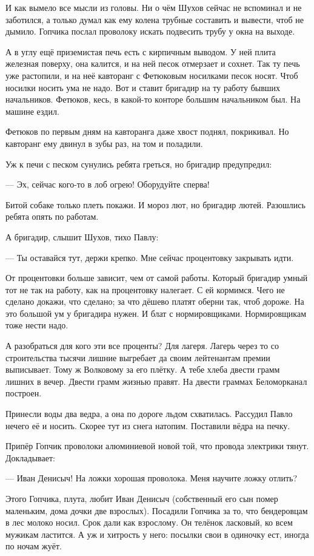 И \dash как вымело все мысли из головы. Ни о чём Шухов сейчас не вспоминал и не заботился, а
только думал \dash как ему колена трубные составить и вывести, чтоб не дымило. Гопчика послал
проволоку искать \dash подвесить трубу у окна на выходе.

А в углу ещё приземистая печь есть с кирпичным выводом. У ней плита железная поверху, она
калится, и на ней песок отмерзает и сохнет. Так ту печь уже растопили, и на неё кавторанг с
Фетюковым носилками песок носят. Чтоб носилки носить \dash ума не надо. Вот и ставит бригадир на
ту работу бывших начальников. Фетюков, кесь, в какой-то конторе большим начальником был. На
машине ездил.

Фетюков по первым дням на кавторанга даже хвост поднял, покрикивал. Но кавторанг ему двинул
в зубы раз, на том и поладили.

Уж к печи с песком сунулись ребята греться, но бригадир предупредил:

--- Эх, сейчас кого-то в лоб огрею! Оборудуйте сперва!

Битой собаке только плеть покажи. И мороз лют, но бригадир лютей. Разошлись ребята опять по
работам.

А бригадир, слышит Шухов, тихо Павлу:

--- Ты оставайся тут, держи крепко. Мне сейчас процентовку закрывать идти.

От процентовки больше зависит, чем от самой работы. Который бригадир умный \dash тот не так на
работу, как на процентовку налегает. С ей кормимся. Чего не сделано \dash докажи, что сделано; за
что дёшево платят \dash оберни так, чтоб дороже. На это большой ум у бригадира нужен. И блат с
нормировщиками. Нормировщикам тоже нести надо.

А разобраться \dash для кого эти все проценты? Для лагеря. Лагерь через то со строительства
тысячи лишние выгребает да своим лейтенантам премии выписывает. Тому ж Волковому за его
плётку. А тебе \dash хлеба двести грамм лишних в вечер. Двести грамм жизнью правят. На двести
граммах Беломорканал построен.

Принесли воды два ведра, а она по дороге льдом схватилась. Рассудил Павло \dash нечего её и
носить. Скорее тут из снега натопим. Поставили вёдра на печку.

Припёр Гопчик проволоки алюминиевой новой \dash той, что провода электрики тянут. Докладывает:

--- Иван Денисыч! На ложки хорошая проволока. Меня научите ложку отлить?

Этого Гопчика, плута, любит Иван Денисыч (собственный его сын помер маленьким, дома дочки две
взрослых). Посадили Гопчика за то, что бендеровцам в лес молоко носил. Срок дали как
взрослому. Он \dash телёнок ласковый, ко всем мужикам ластится. А уж и хитрость у него: посылки
свои в одиночку ест, иногда по ночам жуёт.

